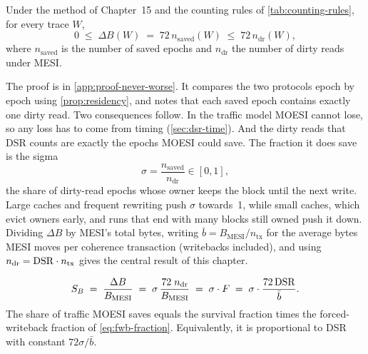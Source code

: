 \begin{proposition}
\label{prop:never-worse}
Under the method of Chapter~15 and the counting rules of
\cref{tab:counting-rules}, for every trace $W$,
\[
  0 \;\le\; \Delta B(W) \;=\; 72\, n_{\mathrm{saved}}(W) \;\le\; 72\, n_{\mathrm{dr}}(W),
\]
where $n_{\mathrm{saved}}$ is the number of saved epochs and $n_{\mathrm{dr}}$ the
number of dirty reads under MESI.
\end{proposition}

\noindent The proof is in \cref{app:proof-never-worse}. It compares the two
protocols epoch by epoch using \cref{prop:residency}, and notes that each saved
epoch contains exactly one dirty read. Two consequences follow. In the traffic
model MOESI cannot lose, so any loss has to come from timing (\cref{sec:dsr-time}).
And the dirty reads that DSR counts are exactly the epochs MOESI could save. The
fraction it does save is the \gls{sigma}
\begin{equation}
  \sigma = \frac{n_{\mathrm{saved}}}{n_{\mathrm{dr}}} \in [0,1],
  \label{eq:sigma}
\end{equation}
the share of dirty-read epochs whose owner keeps the block until the next write.
Large caches and frequent rewriting push $\sigma$ towards~1, while small caches,
which evict owners early, and runs that end with many blocks still owned push it
down. Dividing $\Delta B$ by MESI's total bytes, writing $\bar b =
B_{\mathrm{MESI}}/n_{\mathrm{tx}}$ for the average bytes MESI moves per coherence
transaction (writebacks included), and using $n_{\mathrm{dr}} = \mathrm{DSR}\cdot
n_{\mathrm{tx}}$ gives the central result of this chapter.

\begin{keybox}
\begin{equation}
  S_B \;=\; \frac{\Delta B}{B_{\mathrm{MESI}}}
      \;=\; \sigma\,\frac{72\; n_{\mathrm{dr}}}{B_{\mathrm{MESI}}}
      \;=\; \sigma \cdot F \;=\; \sigma\cdot\frac{72\,\mathrm{DSR}}{\bar b}.
  \label{eq:identity}
\end{equation}
The share of traffic MOESI saves equals the survival fraction times the
forced-writeback fraction of \cref{eq:fwb-fraction}. Equivalently, it is
proportional to DSR with constant $72\sigma/\bar b$.
\end{keybox}

